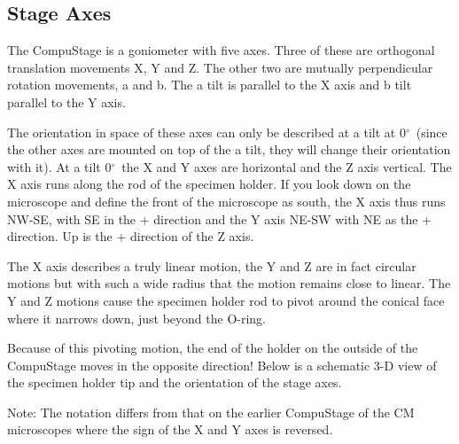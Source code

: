 \documentclass[12pt]{article}
\newcommand{\degree}{\ensuremath{^\circ}}
\begin{document}
\subsection{Stage Axes}

The CompuStage is a goniometer with five axes. Three of these are
orthogonal translation movements X, Y and Z. The other two are mutually
perpendicular rotation movements, a and b. The a tilt is parallel
to the X axis and b tilt parallel to the Y axis.

The orientation in space of these axes can only be described at a tilt
at 0\degree\ (since the other axes are mounted on top of the a tilt,
they will change their orientation with it). At a tilt 0\degree\ the X
and Y axes are horizontal and the Z axis vertical. The X axis runs
along the rod of the specimen holder. If you look down
on the microscope and define the front of the microscope as south, the
X axis thus runs NW-SE, with SE in the + direction and the Y axis NE-SW
with NE as the + direction. Up is the + direction of the Z axis.

The X axis describes a truly linear motion, the Y and Z are in fact
circular motions but with such a wide radius that the motion remains
close to linear. The Y and Z motions cause the specimen holder rod to
pivot around the conical face where it narrows down, just beyond the
O-ring.

Because of this pivoting motion, the end of the holder on the outside
of the CompuStage moves in the opposite direction! Below is a schematic
3-D view of the specimen holder tip and the orientation of the stage
axes.

Note: The notation differs from that on the earlier CompuStage of the
CM microscopes where the sign of the X and Y axes is reversed.
\end{document}
